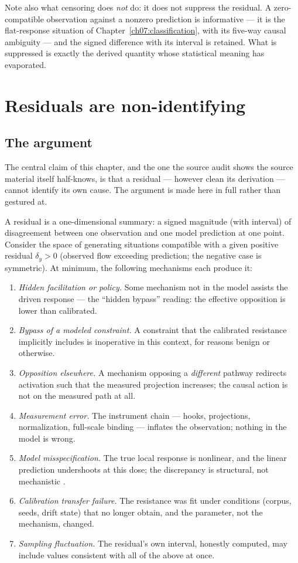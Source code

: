 Note also what censoring does \emph{not} do: it does not suppress the
residual. A zero-compatible observation against a nonzero prediction is
informative --- it is the flat-response situation of
Chapter~\ref{ch07:classification}, with its five-way causal ambiguity
--- and the signed difference with its interval is retained. What is
suppressed is exactly the derived quantity whose statistical meaning has
evaporated.

\section{Residuals are non-identifying}\label{ch10:sec:nonident}

\subsection{The argument}

The central claim of this chapter, and the one the source audit shows
the source material itself half-knows, is that a residual --- however
clean its derivation --- cannot identify its own cause. The argument
is made here in full rather than gestured at.

A residual is a one-dimensional summary: a signed magnitude (with
interval) of disagreement between one observation and one model
prediction at one point. Consider the space of generating situations
compatible with a given positive residual $\delta_y > 0$ (observed flow
exceeding prediction; the negative case is symmetric). At minimum, the
following mechanisms each produce it:

\begin{enumerate}
\item \emph{Hidden facilitation or policy.} Some mechanism not in the
model assists the driven response --- the ``hidden bypass'' reading: the
effective opposition is lower than calibrated.
\item \emph{Bypass of a modeled constraint.} A constraint that the
calibrated resistance implicitly includes is inoperative in this
context, for reasons benign or otherwise.
\item \emph{Opposition elsewhere.} A mechanism opposing a
\emph{different} pathway redirects activation such that the measured
projection increases; the causal action is not on the measured path at
all.
\item \emph{Measurement error.} The instrument chain --- hooks,
projections, normalization, full-scale binding --- inflates the
observation; nothing in the model is wrong.
\item \emph{Model misspecification.} The true local response is
nonlinear, and the linear prediction undershoots at this dose; the
discrepancy is structural, not mechanistic \cite{kennedyohagan}.
\item \emph{Calibration transfer failure.} The resistance was fit under
conditions (corpus, seeds, drift state) that no longer obtain, and the
parameter, not the mechanism, changed.
\item \emph{Sampling fluctuation.} The residual's own interval, honestly
computed, may include values consistent with all of the above at once.
\end{enumerate}

